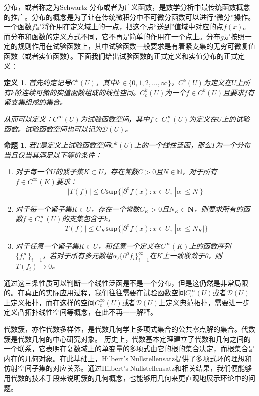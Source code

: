 \documentclass{article}
\newtheorem{definition}{定义}
\newtheorem{proposition}{命题}
\begin{document}
分布，或者称之为Schwartz 分布或者为广义函数，是数学分析中最传统函数概念的推广。分布的概念是为了让在传统微积分中不可微分函数可以进行“微分”操作。一个函数$f$是将作用在定义域上的一点，把这个点“送到”值域中对应的点$f(x)$。而分布和函数的定义方式不同，它不再是简单的作用在一个点上。分布$g$是按照一定的规则作用在试验函数上，其中试验函数一般要求是有着紧支集的无穷可微复值函数（或者实值函数）。下面我们给出试验函数的正式定义和实值分布的正式定义：
\begin{definition}
首先约定记号$C^{k}(U)$，其中$k\in\{0,1,2,...,\infty\}$。$C^{k}(U)$为定义在$U$上所有$k$阶连续可微的实值函数组成的线性空间。$C_{c}^{k}(U)$为一个$f\in C^{k}(U)$且要求$f$有紧支集组成的集合。

从而可以定义：$C^{\infty}(U)$为试验函数空间，其中$f\in C^{\infty}_{c}(U)$为定义在$U$上的试验函数。试验函数空间也可以记为$\mathcal{D}(U)$。
\end{definition}
\begin{proposition}
若$T$是定义上试验函数空间$C^{k}(U)$上的一个线性泛函，那么$T$为一个分布当且仅当其满足以下等价条件：
\begin{enumerate}
    \item 对于每一个$U$的紧子集$K\subset U$，存在常数$C>0$且$N\in\mathbb{N}$，对于所有$f\in C^{\infty}(K)$要求：
    $$|T(f)|\leq C \mathbf{sup}\{|\partial^{\alpha}f(x):x\in U,\ |\alpha|\leq N|\}$$
    \item 对于每一个紧子集$K\in U$，存在一个常数$C_{K}>0$且$N_{K}\in\mathbf{N}$，则要求所有的函数$f\in C^{\infty}_{c}(U)$的支集包含于$k$，
    $$|T(f)|\leq C_{K} \mathbf{sup}\{|\partial^{\alpha}f(x):x\in U,\ |\alpha|\leq N_{K}|\}$$
    \item 对于任意一个紧子集$K\in U$，和任意一个定义在$C^{\infty}(K)$上的函数序列$\{f_{i}^{\infty}\}_{i=1}$，若对于所有多元数组$\alpha$,$\{\partial^{\alpha}f_{i}\}^{\infty}_{i=1}$在$K$上一致收敛于0，则$T(f_{i})\rightarrow 0$。
\end{enumerate}
\end{proposition}
通过这三条性质可以判断一个线性泛函是不是一个分布，但是这仍然是非常局限的。在真正的实际应用过程，我们往往需要在试验函数空间$C^{\infty}_{c}(U)$或者$\mathcal{D}(U)$上定义拓扑，而在这样的空间$C^{\infty}_{c}(U)$或者$\mathcal{D}(U)$上定义典范拓扑，需要进一步定义凸拓扑线性空间等概念，在此不再一一解释。

代数簇，亦作代数多样体，是代数几何学上多项式集合的公共零点解的集合。代数簇是代数几何的中心研究对象。
历史上，代数基本定理建立了代数和几何之间的一个联系，它表明在复数域上的单变量的多项式由它的根的集合决定，而根集合是内在的几何对象。在此基础上，Hilbert's Nullstellensatz提供了多项式环的理想和仿射空间子集的对应关系。通过Hilbert's Nullstellensatz和相关结果，我们便能够用代数的技术手段来说明簇的几何概念，也能够用几何来更直观地展示环论中的问题。
\end{document}

